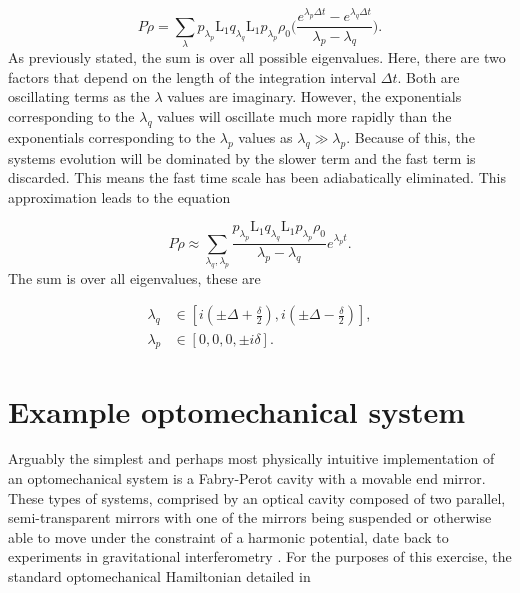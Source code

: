 \documentclass[12pt]{article}
\begin{document}
\begin{equation}
    P\dot{\rho}=\sum_{\lambda} p_{\lambda_p} \mathrm{L}_1  q_{\lambda_q}\mathrm{L}_1p_{\lambda_p} \rho_0\Bigg(\frac{e^{\lambda_p\Delta t}-e^{\lambda_q \Delta t}}{\lambda_p-\lambda_q}\Bigg).
\end{equation} As previously stated, the sum is over all possible eigenvalues. Here, there are two factors that depend on the length of the integration interval $\Delta t$. Both are oscillating terms as the $\lambda$ values are imaginary. However, the exponentials corresponding to the $\lambda_q$ values will oscillate much more rapidly than the exponentials corresponding to the $\lambda_p$ values as $\lambda_q \gg \lambda_p$. Because of this, the systems evolution will be dominated by the slower term and the fast term is discarded. This means the fast time scale has been adiabatically eliminated. This approximation leads to the equation

\begin{equation}\label{eq:ProyectedEqAfterAdiabatic}
    P\dot{\rho} \approx \sum_{\lambda_q,\lambda_p} \frac{p_{\lambda_p} \mathrm{L}_1  q_{\lambda_q}\mathrm{L}_1p_{\lambda_p}\rho_0}{\lambda_p-\lambda_q} e^{\lambda_p t}.
\end{equation} The sum is over all eigenvalues, these are

\begin{align*}
    \lambda_q &\in [ i(\pm\Delta+\frac{\delta}{2}), i(\pm\Delta - \frac{\delta}{2} )],\\
    \lambda_p &\in [0,0,0, \pm i\delta].
\end{align*}
    


\section{Example optomechanical system}\label{sec:ExampleSystem}

Arguably the simplest and perhaps most physically intuitive implementation of an optomechanical system is a Fabry-Perot cavity with a movable end mirror. These types of systems, comprised by an optical cavity composed of two parallel, semi-transparent mirrors with one of the mirrors being suspended or otherwise able to move under the constraint of a harmonic potential, date back to experiments in gravitational interferometry \cite{AbramoviciLIGO1992}. For the purposes of this exercise,  the standard optomechanical Hamiltonian detailed in \cite{LawMovingMirror1995}
\end{document}
